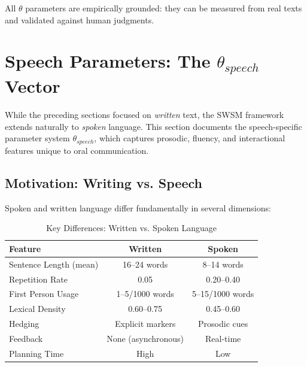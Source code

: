 \begin{axiom}
\label{ax:swsm-20}
All $\theta$ parameters are empirically grounded: they can be measured from real texts and validated against human judgments.
\end{axiom}


\section{Speech Parameters: The $\theta_{speech}$ Vector}
\label{sec:sw-speech}

While the preceding sections focused on \emph{written} text, the SWSM framework extends naturally to \emph{spoken} language. This section documents the speech-specific parameter system $\theta_{speech}$, which captures prosodic, fluency, and interactional features unique to oral communication.

\subsection{Motivation: Writing vs. Speech}
\label{sec:sw-speech-motivation}

Spoken and written language differ fundamentally in several dimensions:

\begin{table}[h]
\centering
\caption{Key Differences: Written vs. Spoken Language}
\label{tab:sw-written-speech}
\begin{tabular}{lcc}
\toprule
\textbf{Feature} & \textbf{Written} & \textbf{Spoken} \\
\midrule
Sentence Length (mean) & 16--24 words & 8--14 words \\
Repetition Rate & 0.05 & 0.20--0.40 \\
First Person Usage & 1--5/1000 words & 5--15/1000 words \\
Lexical Density & 0.60--0.75 & 0.45--0.60 \\
Hedging & Explicit markers & Prosodic cues \\
Feedback & None (asynchronous) & Real-time \\
Planning Time & High & Low \\
\bottomrule
\end{tabular}
\end{table}

